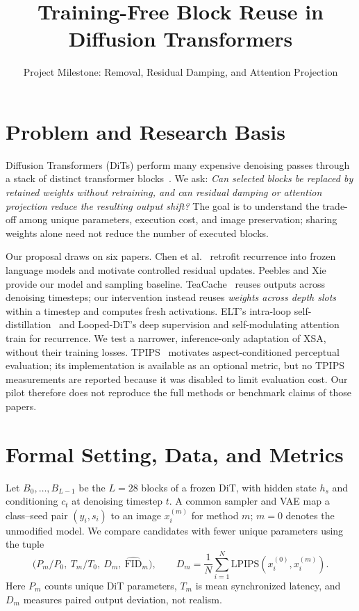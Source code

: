 \documentclass[sigconf,nonacm]{acmart}
\title{Training-Free Block Reuse in Diffusion Transformers}
\subtitle{Project Milestone: Removal, Residual Damping, and Attention Projection}
\begin{document}
\maketitle

\section{Problem and Research Basis}
Diffusion Transformers (DiTs) perform many expensive denoising passes through
a stack of distinct transformer blocks~\cite{peebles2023dit}. We ask:
\emph{Can selected blocks be replaced by retained weights without retraining,
and can residual damping or attention projection reduce the resulting output
shift?} The goal is to understand the trade-off among unique parameters,
execution cost, and image preservation; sharing weights alone need not reduce
the number of executed blocks.

Our proposal draws on six papers. Chen et al.~\cite{chen2026trainingfree}
retrofit recurrence into frozen language models and motivate controlled
residual updates. Peebles and Xie~\cite{peebles2023dit} provide our model and
sampling baseline. TeaCache~\cite{liu2025teacache} reuses outputs across
denoising timesteps; our intervention instead reuses \emph{weights across
depth slots} within a timestep and computes fresh activations. ELT's
intra-loop self-distillation~\cite{goyal2026elt} and Looped-DiT's deep
supervision and self-modulating attention~\cite{chng2026loopeddit} train for
recurrence. We test a narrower, inference-only adaptation of XSA, without
their training losses. TPIPS~\cite{wang2026tpips} motivates aspect-conditioned
perceptual evaluation; its implementation is available as an optional metric,
but no TPIPS measurements are reported because it was disabled to limit
evaluation cost. Our pilot therefore does not reproduce the full methods or
benchmark claims of those papers.

\section{Formal Setting, Data, and Metrics}
Let $B_0,\ldots,B_{L-1}$ be the $L=28$ blocks of a frozen DiT, with hidden
state $h_s$ and conditioning $c_t$ at denoising timestep $t$. A common sampler
and VAE map a class--seed pair $(y_i,s_i)$ to an image $x_i^{(m)}$ for method
$m$; $m=0$ denotes the unmodified model. We compare candidates with fewer
unique parameters using the tuple
\begin{equation}
 \bigl(P_m/P_0,\ T_m/T_0,\ D_m,\ \widehat{\mathrm{FID}}_m\bigr),
 \qquad
 D_m=\frac1N\sum_{i=1}^{N}\mathrm{LPIPS}(x_i^{(0)},x_i^{(m)}).
 \label{eq:objective}
\end{equation}
Here $P_m$ counts unique DiT parameters, $T_m$ is mean synchronized latency,
and $D_m$ measures paired output deviation, not realism.
\end{document}

